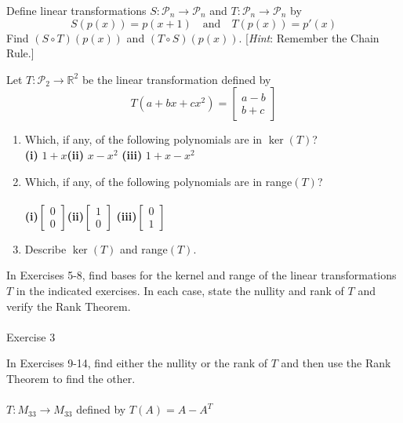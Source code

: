 \documentclass[12pt,letterpaper]{hmcpset}
\newcommand{\m}[1]{\begin{bmatrix} #1 \end{bmatrix}}
\begin{document}
\begin{problem}[6.4.27]
    Define linear transformations $S:\mathscr{P}_n\to\mathscr{P}_n$
    and $T: \mathscr{P}_n\to\mathscr{P}_n$ by
    \[
        S(p(x))=p(x+1)\quad\text{and}\quad T(p(x))=p'(x)
    \]
    Find $(S\circ T)(p(x))$ and $(T\circ S)(p(x))$. [\textit{Hint}: Remember the
    Chain Rule.]
\end{problem}
\begin{solution}
    \vfill
\end{solution}
\newpage

\begin{problem}[6.5.3]
    Let $T:\mathscr{P}_2\to\mathbb{R}^2$ be the linear transformation defined by
    \[
        T(a+bx+cx^2)=\m{a-b\\b+c}
    \]
    \begin{enumerate}
        \item Which, if any, of the following polynomials are in $\ker(T)$?\\
            \textbf{(i)} $1+x$\quad\textbf{(ii)} $x-x^2$\quad
            \textbf{(iii)} $1+x-x^2$
        \item Which, if any, of the following polynomials are in range$(T)$?\\\\
            \textbf{(i)}$\m{0\\0}$\quad\textbf{(ii)}$\m{1\\0}$\quad
            \textbf{(iii)}$\m{0\\1}$
        \item Describe $\ker(T)$ and range$(T)$.
    \end{enumerate}
\end{problem}
\begin{solution}
    \vfill
\end{solution}
\newpage

\begin{problem}[6.5.7]
    In Exercises 5-8, find bases for the kernel and range of the
    linear transformations $T$ in the indicated exercises. In each
    case, state the nullity and rank of $T$ and verify the Rank
    Theorem.\\\\
    Exercise 3
\end{problem}
\begin{solution}
    \vfill
\end{solution}
\newpage

\begin{problem}[6.5.14]
    In Exercises 9-14, find either the nullity or the rank of $T$ and
    then use the Rank Theorem to find the other.\\\\
    $T:M_{33}\to M_{33}$ defined by $T(A)=A-A^T$
\end{problem}
\begin{solution}
    \vfill
\end{solution}
\newpage
\end{document}
